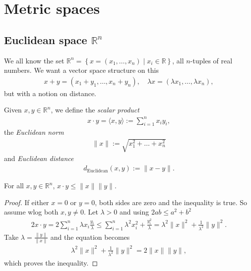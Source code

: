 \chapter{Metric spaces}

\section{Euclidean space $\mathbb{R}^{n}$}

We all know the set $\mathbb{R}^{n} = \left\{ x = (x_{1}, \dots, x_{n}) \mid x_{i} \in \mathbb{R} \right\}$, all $n$-tuples of real numbers. We want a vector space structure on this
\begin{align*}
	x + y = (x_{1} + y_{1}, \dots, x_{n} + y_{n}), \quad \lambda x = (\lambda x_{1}, \dots, \lambda x_{n}),
\end{align*}
but with a notion on distance.

\begin{definition}\label{def:euclid_norm}
	Given $x,y \in \mathbb{R}^{n}$, we define the \textit{scalar product}
	\begin{align*}
		x \cdot y = \langle x, y \rangle := \sum_{i=1}^{n} x_{i}y_{i},
	\end{align*}
	the \textit{Euclidean norm}
	\begin{align*}
		\lVert x \rVert := \sqrt{x_{1}^{2} + \dots + x_{n}^{2}}
	\end{align*}
	and \textit{Euclidean distance}
	\begin{align*}
		d_{\text{Euclidean}}(x,y) := \lVert x - y \rVert.
	\end{align*}
\end{definition}

\begin{lemma}\label{lem:cauchy-schwartz}
	For all $x, y \in \mathbb{R}^{n}$, $ x \cdot y \leq \lVert x \rVert \lVert y \rVert $.
\end{lemma}
\begin{proof}
	If either $x = 0$ or $y = 0$, both sides are zero and the inequality is true. So assume wlog both $x,y \neq 0$. Let $\lambda > 0$ and using $2ab \leq a^{2} + b^{2}$
	\begin{align*}
		2x\cdot y = 2 \sum_{i=1}^{n} \lambda x_{i} \frac{y_{i}}{\lambda} \leq \sum_{i=1}^{n} \lambda^{2}x_{i}^{2} + \frac{y_{i}^{2}}{\lambda } = \lambda^{2} \lVert x \rVert^{2} + \frac{1}{\lambda^{2}} \lVert y \rVert^{2}.
	\end{align*}
	Take $\lambda = \displaystyle\frac{\lVert y \rVert }{\lVert x \rVert }$ and the equation becomes
	\begin{align*}
		\lambda^{2} \lVert x \rVert^{2} + \frac{1}{\lambda^{2}} \lVert y \rVert^{2} = 2\lVert x \rVert \lVert y \rVert,
	\end{align*}
	which proves the inequality.
\end{proof}

